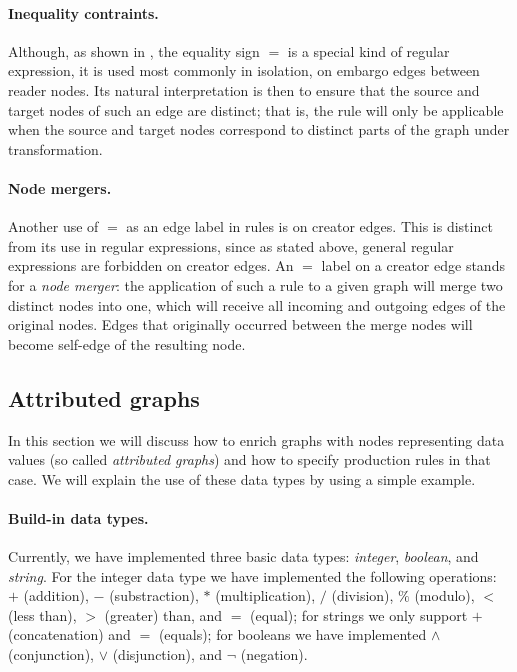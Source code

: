 \paragraph{Inequality contraints.}

Although, as shown in , the equality sign $=$ is a special kind of
regular expression, it is used most commonly in isolation, on embargo edges
between reader nodes. Its natural interpretation is then to ensure that the
source and target nodes of such an edge are distinct; that is, the rule will
only be applicable when the source and target nodes correspond to distinct
parts of the graph under transformation.

\paragraph{Node mergers.}

Another use of $=$ as an edge label in rules is on creator edges. This is
distinct from its use in regular expressions, since as stated above, general
regular expressions are forbidden on creator edges. An $=$ label on a creator
edge stands for a \emph{node merger}: the application of such a rule to a given
graph will merge two distinct nodes into one, which will receive all incoming
and outgoing edges of the original nodes. Edges that originally
occurred between the merge nodes will become self-edge of the
resulting node.

\subsection{Attributed graphs}

In this section we will discuss how to enrich graphs with nodes
representing data values (so called \emph{attributed graphs}) and how
to specify production rules in that case. We will explain the use of
these data types by using a simple example.

\paragraph{Build-in data types.}

Currently, we have implemented three basic data types:
\emph{integer}, \emph{boolean}, and \emph{string}. For the integer
data type we have implemented the following operations: $+$ (addition),
$-$ (substraction), $*$ (multiplication), $/$ (division), $\%$
(modulo), $<$ (less than), $>$ (greater) than, and $=$ (equal); for
strings we only support $+$ (concatenation) and $=$ (equals); for
booleans we have implemented $\wedge$ (conjunction), $\vee$
(disjunction), and $\neg$ (negation).

